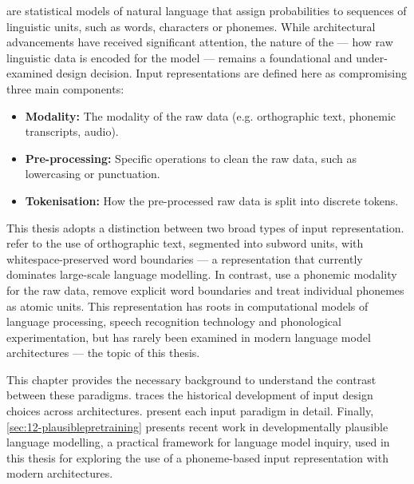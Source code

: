  are statistical models of natural language that assign probabilities to sequences of linguistic units, such as words, characters or phonemes. While architectural advancements have received significant attention, the nature of the  --- how raw linguistic data is encoded for the model --- remains a foundational and under-examined design decision. Input representations are defined here as compromising three main components:

\begin{itemize}
    \item \textbf{Modality:} The modality of the raw data (e.g. orthographic text, phonemic transcripts, audio).
    \item \textbf{Pre-processing:} Specific operations to clean the raw data, such as lowercasing or punctuation. 
    \item \textbf{Tokenisation:} How the pre-processed raw data is split into discrete tokens.
\end{itemize}


This thesis adopts a distinction between two broad types of input representation.  refer to the use of orthographic text, segmented into subword units, with whitespace-preserved word boundaries --- a representation that currently dominates large-scale language modelling. In contrast,  use a phonemic modality for the raw data, remove explicit word boundaries and treat individual phonemes as atomic units. This representation has roots in computational models of language processing, speech recognition technology and phonological experimentation, but has rarely been examined in modern language model architectures --- the topic of this thesis.

This chapter provides the necessary background to understand the contrast between these paradigms.  traces the historical development of input design choices across architectures.  present each input paradigm in detail. Finally, \cref{sec:12-plausiblepretraining} presents recent work in developmentally plausible language modelling, a practical framework for language model inquiry, used in this thesis for exploring the use of a phoneme-based input representation with modern architectures.


